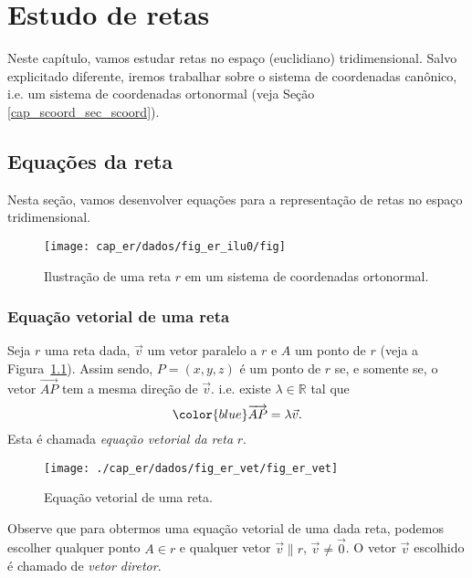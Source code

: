 

\chapter{Estudo de retas}\label{cap_er}
\thispagestyle{fancy}

Neste capítulo, vamos estudar retas no espaço (euclidiano) tridimensional. Salvo explicitado diferente, iremos trabalhar sobre o sistema de coordenadas canônico, i.e. um sistema de coordenadas ortonormal (veja Seção \ref{cap_scoord_sec_scoord}).

\section{Equações da reta}\label{cap_ert_sec_eqsreta}

Nesta seção, vamos desenvolver equações para a representação de retas no espaço tridimensional.

\begin{figure}[H]
  \centering
  \texttt{[image: cap\_er/dados/fig\_er\_ilu0/fig]}
  \caption{Ilustração de uma reta $r$ em um sistema de coordenadas ortonormal.}
\end{figure}

\subsection{Equação vetorial de uma reta}

Seja $r$ uma reta dada, $\vec{v}$ um vetor paralelo a $r$ e $A$ um ponto de $r$ (veja a Figura~\ref{fig:er_vet}). Assim sendo, $P=(x,y,z)$ é um ponto de $r$ se, e somente se, o vetor $\overrightarrow{AP}$ tem a mesma direção de $\vec{v}$. i.e. existe $\lambda\in\mathbb{R}$ tal que
\begin{equation}
  {\color{blue}\overrightarrow{AP} = \lambda\vec{v}}.
\end{equation}
Esta é chamada \emph{equação vetorial da reta} $r$.

\begin{figure}[H]
  \centering
  \texttt{[image: ./cap\_er/dados/fig\_er\_vet/fig\_er\_vet]}
  \caption{Equação vetorial de uma reta.}
  \label{fig:er_vet}
\end{figure}

Observe que para obtermos uma equação vetorial de uma dada reta, podemos escolher qualquer ponto $A\in r$ e qualquer vetor $\vec{v}\parallel r$, $\vec{v}\neq\vec{0}$. O vetor $\vec{v}$ escolhido é chamado de \emph{vetor diretor}.

